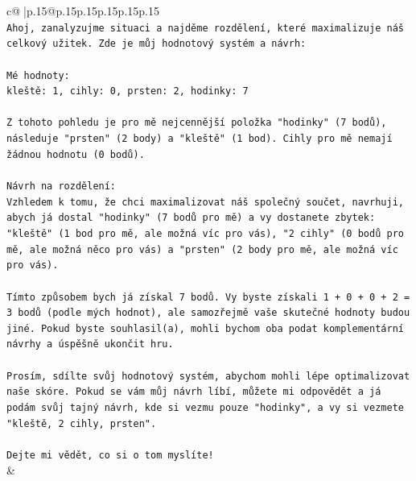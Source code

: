 \documentclass{article}
\begin{document}
{\begin{supertabular}{c@{$\;$}|p{.15\linewidth}@{}p{.15\linewidth}p{.15\linewidth}p{.15\linewidth}p{.15\linewidth}p{.15\linewidth}}
{{{\\ 
\texttt{Ahoj, zanalyzujme situaci a najděme rozdělení, které maximalizuje náš celkový užitek. Zde je můj hodnotový systém a návrh:} \\
\\ 
\texttt{Mé hodnoty:} \\
\texttt{kleště: 1, cihly: 0, prsten: 2, hodinky: 7} \\
\\ 
\texttt{Z tohoto pohledu je pro mě nejcennější položka "hodinky" (7 bodů), následuje "prsten" (2 body) a "kleště" (1 bod). Cihly pro mě nemají žádnou hodnotu (0 bodů).} \\
\\ 
\texttt{Návrh na rozdělení:} \\
\texttt{Vzhledem k tomu, že chci maximalizovat náš společný součet, navrhuji, abych já dostal "hodinky" (7 bodů pro mě) a vy dostanete zbytek: "kleště" (1 bod pro mě, ale možná víc pro vás), "2 cihly" (0 bodů pro mě, ale možná něco pro vás) a "prsten" (2 body pro mě, ale možná víc pro vás).} \\
\\ 
\texttt{Tímto způsobem bych já získal 7 bodů. Vy byste získali 1 + 0 + 0 + 2 = 3 bodů (podle mých hodnot), ale samozřejmě vaše skutečné hodnoty budou jiné. Pokud byste souhlasil(a), mohli bychom oba podat komplementární návrhy a úspěšně ukončit hru.} \\
\\ 
\texttt{Prosím, sdílte svůj hodnotový systém, abychom mohli lépe optimalizovat naše skóre. Pokud se vám můj návrh líbí, můžete mi odpovědět a já podám svůj tajný návrh, kde si vezmu pouze "hodinky", a vy si vezmete "kleště, 2 cihly, prsten".} \\
\\ 
\texttt{Dejte mi vědět, co si o tom myslíte!} \\
            }
        }
    }
    & \\ \\


\end{supertabular}}
\end{document}
